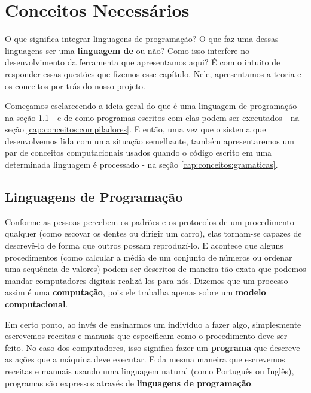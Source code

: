 
\chapter{Conceitos Necessários}
\label{cap:conceitos}

  O que significa integrar linguagens de programação? O que faz uma dessas
  linguagens ser uma \textbf{linguagem de \script{}} ou não? Como isso interfere
  no desenvolvimento da ferramenta que apresentamos aqui? É com o intuito de
  responder essas questões que fizemos esse capítulo. Nele, apresentamos a
  teoria e os conceitos por trás do nosso projeto.

  Começamos esclarecendo a ideia geral do que é uma linguagem de programação -
  na seção \ref{cap:conceitos:linguagens} - e de como programas escritos com
  elas podem ser executados - na seção \ref{cap:conceitos:compiladores}.
  E então, uma vez que o sistema que desenvolvemos lida com uma situação
  semelhante, também apresentaremos um par de conceitos computacionais usados
  quando o código escrito em uma determinada linguagem é processado - na seção
  \ref{cap:conceitos:gramaticas}.

  \section{Linguagens de Programação}
  \label{cap:conceitos:linguagens}

  Conforme as pessoas percebem os padrões e os protocolos de um procedimento
  qualquer (como escovar os dentes ou dirigir um carro), elas tornam-se capazes
  de descrevê-lo de forma que outros possam reproduzí-lo. E acontece que alguns
  procedimentos (como calcular a média de um conjunto de números ou ordenar uma
  sequência de valores) podem ser descritos de maneira tão exata que podemos
  mandar computadores digitais realizá-los para nós. Dizemos que um processo
  assim é uma \textbf{computação}, pois ele trabalha apenas sobre um
  \textbf{modelo computacional}.
  
  Em certo ponto, ao invés de ensinarmos um indivíduo a fazer algo, simplesmente
  escrevemos receitas e manuais que especificam como o procedimento deve ser
  feito. No caso dos computadores, isso significa fazer um \textbf{programa}
  que descreve as ações que a máquina deve executar. E da mesma maneira que
  escrevemos receitas e manuais usando uma linguagem natural (como Português ou
  Inglês), programas são expressos através de \textbf{linguagens de
  programação}.

